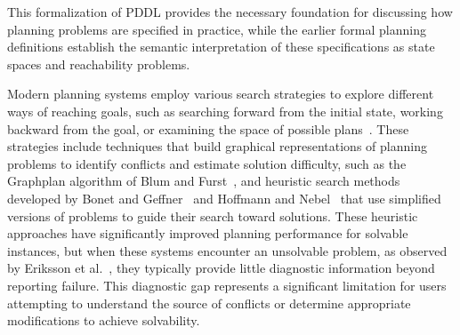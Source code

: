This formalization of \ac{PDDL} provides the necessary foundation for discussing how planning problems are specified in practice, while the earlier formal planning definitions establish the semantic interpretation of these specifications as state spaces and reachability problems.

Modern planning systems employ various search strategies to explore different ways of reaching goals, such as searching forward from the initial state, working backward from the goal, or examining the space of possible plans~\cite{Ghallab2004,Russell2016}. These strategies include techniques that build graphical representations of planning problems to identify conflicts and estimate solution difficulty, such as the Graphplan algorithm of Blum and Furst~\cite{Blum1997}, and heuristic search methods developed by Bonet and Geffner~\cite{Bonet2001} and Hoffmann and Nebel~\cite{Hoffmann2001} that use simplified versions of problems to guide their search toward solutions. These heuristic approaches have significantly improved planning performance for solvable instances, but when these systems encounter an unsolvable problem, as observed by Eriksson et al.~\cite{Eriksson2018}, they typically provide little diagnostic information beyond reporting failure. This diagnostic gap represents a significant limitation for users attempting to understand the source of conflicts or determine appropriate modifications to achieve solvability.
